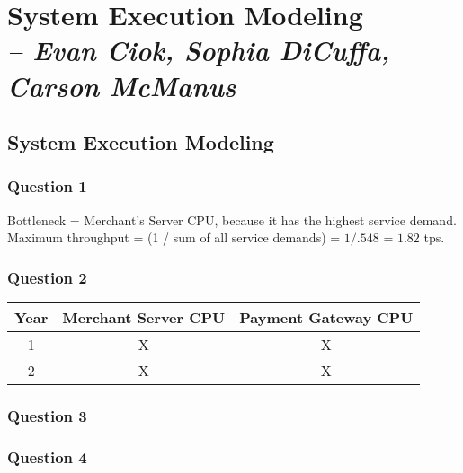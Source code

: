 \chapter{System Execution Modeling \\
  \small{\textit{-- Evan Ciok, Sophia DiCuffa, Carson McManus}}
  \label{Chapter::LabThree}}


\section{System Execution Modeling \label{Section::LabThree}}

\subsection{Question 1}
Bottleneck = Merchant’s Server CPU, because it has the highest service demand.
Maximum throughput = (1 / sum of all service demands) = $1/.548$ = $1.82$ tps.

\subsection{Question 2}

\begin{center}
  \begin{tabular}{ |c|c|c| }
    \hline
    Year & Merchant Server CPU & Payment Gateway CPU \\
    \hline
    1    & X                   & X                   \\
    \hline
    2    & X                   & X                   \\
    \hline
  \end{tabular}
\end{center}

\subsection{Question 3}

\subsection{Question 4}
